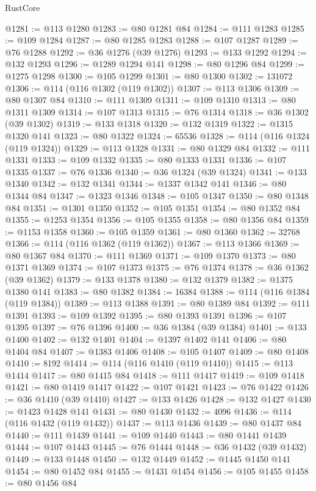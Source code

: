 \begin{lexlean}{RustCore}
\begin{coremodule}
@1281 := @113 @1280
@1283 := @80 @1281 @84
@1284 := @111 @1283
@1285 := @109 @1284
@1287 := @80 @1285 @1283
@1288 := @107 @1287
@1289 := @76 @1288
@1292 := @36 @1276 (@39 @1276)
@1293 := @133 @1292
@1294 := @132 @1293
@1296 := @1289 @1294 @141
@1298 := @80 @1296 @84
@1299 := @1275 @1298
@1300 := @105 @1299
@1301 := @80 @1300
@1302 := 131072
@1306 := @114 (@116 @1302 (@119 @1302))
@1307 := @113 @1306
@1309 := @80 @1307 @84
@1310 := @111 @1309
@1311 := @109 @1310
@1313 := @80 @1311 @1309
@1314 := @107 @1313
@1315 := @76 @1314
@1318 := @36 @1302 (@39 @1302)
@1319 := @133 @1318
@1320 := @132 @1319
@1322 := @1315 @1320 @141
@1323 := @80 @1322
@1324 := 65536
@1328 := @114 (@116 @1324 (@119 @1324))
@1329 := @113 @1328
@1331 := @80 @1329 @84
@1332 := @111 @1331
@1333 := @109 @1332
@1335 := @80 @1333 @1331
@1336 := @107 @1335
@1337 := @76 @1336
@1340 := @36 @1324 (@39 @1324)
@1341 := @133 @1340
@1342 := @132 @1341
@1344 := @1337 @1342 @141
@1346 := @80 @1344 @84
@1347 := @1323 @1346
@1348 := @105 @1347
@1350 := @80 @1348 @84
@1351 := @1301 @1350
@1352 := @105 @1351
@1354 := @80 @1352 @84
@1355 := @1253 @1354
@1356 := @105 @1355
@1358 := @80 @1356 @84
@1359 := @1153 @1358
@1360 := @105 @1359
@1361 := @80 @1360
@1362 := 32768
@1366 := @114 (@116 @1362 (@119 @1362))
@1367 := @113 @1366
@1369 := @80 @1367 @84
@1370 := @111 @1369
@1371 := @109 @1370
@1373 := @80 @1371 @1369
@1374 := @107 @1373
@1375 := @76 @1374
@1378 := @36 @1362 (@39 @1362)
@1379 := @133 @1378
@1380 := @132 @1379
@1382 := @1375 @1380 @141
@1383 := @80 @1382
@1384 := 16384
@1388 := @114 (@116 @1384 (@119 @1384))
@1389 := @113 @1388
@1391 := @80 @1389 @84
@1392 := @111 @1391
@1393 := @109 @1392
@1395 := @80 @1393 @1391
@1396 := @107 @1395
@1397 := @76 @1396
@1400 := @36 @1384 (@39 @1384)
@1401 := @133 @1400
@1402 := @132 @1401
@1404 := @1397 @1402 @141
@1406 := @80 @1404 @84
@1407 := @1383 @1406
@1408 := @105 @1407
@1409 := @80 @1408
@1410 := 8192
@1414 := @114 (@116 @1410 (@119 @1410))
@1415 := @113 @1414
@1417 := @80 @1415 @84
@1418 := @111 @1417
@1419 := @109 @1418
@1421 := @80 @1419 @1417
@1422 := @107 @1421
@1423 := @76 @1422
@1426 := @36 @1410 (@39 @1410)
@1427 := @133 @1426
@1428 := @132 @1427
@1430 := @1423 @1428 @141
@1431 := @80 @1430
@1432 := 4096
@1436 := @114 (@116 @1432 (@119 @1432))
@1437 := @113 @1436
@1439 := @80 @1437 @84
@1440 := @111 @1439
@1441 := @109 @1440
@1443 := @80 @1441 @1439
@1444 := @107 @1443
@1445 := @76 @1444
@1448 := @36 @1432 (@39 @1432)
@1449 := @133 @1448
@1450 := @132 @1449
@1452 := @1445 @1450 @141
@1454 := @80 @1452 @84
@1455 := @1431 @1454
@1456 := @105 @1455
@1458 := @80 @1456 @84

\end{coremodule}
\end{lexlean}
